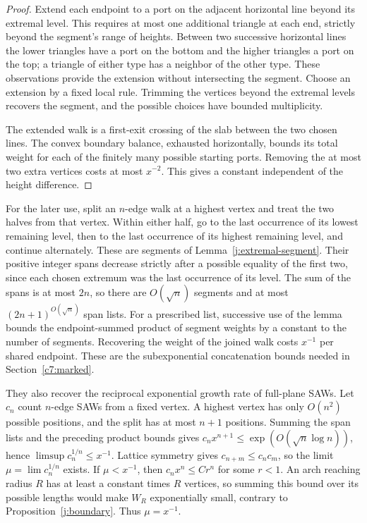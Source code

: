 \begin{proof}
Extend each endpoint to a port on the adjacent horizontal line beyond
its extremal level. This requires at most one additional triangle at
each end, strictly beyond the segment's range of heights. Between two
successive horizontal lines the lower triangles have a port on the
bottom and the higher triangles a port on the top; a triangle of either
type has a neighbor of the other type. These observations provide the
extension without intersecting the segment. Choose an extension by a
fixed local rule. Trimming the vertices beyond the extremal levels
recovers the segment, and the possible choices have bounded multiplicity.

The extended walk is a first-exit crossing of the slab between the two
chosen lines. The convex boundary balance, exhausted horizontally,
bounds its total weight for each of the finitely many possible starting
ports. Removing the at most two extra vertices costs at most $x^{-2}$.
This gives a constant independent of the height difference.
\end{proof}

For the later use, split an $n$-edge walk at a highest vertex and treat
the two halves from that vertex. Within either half, go to the last
occurrence of its lowest remaining level, then to the last occurrence
of its highest remaining level, and continue alternately. These are
segments of Lemma~\ref{j:extremal-segment}. Their positive integer spans
decrease strictly after a possible equality of the first two, since each
chosen extremum was the last occurrence of its level. The sum of the
spans is at most $2n$, so there are $O(\sqrt n)$ segments and at most
$(2n+1)^{O(\sqrt n)}$ span lists. For a prescribed list, successive use
of the lemma bounds the endpoint-summed product of segment weights by a
constant to the number of segments. Recovering the weight of the joined
walk costs $x^{-1}$ per shared endpoint. These are the subexponential
concatenation bounds needed in Section~\ref{c7:marked}.

They also recover the reciprocal exponential growth rate of full-plane
SAWs. Let $c_n$ count $n$-edge SAWs from a fixed vertex. A highest vertex
has only $O(n^2)$ possible positions, and the split has at most $n+1$
positions. Summing the span lists and the preceding product bounds gives
$c_nx^{n+1}\le\exp(O(\sqrt n\log n))$, hence
$\limsup c_n^{1/n}\le x^{-1}$. Lattice symmetry gives
$c_{n+m}\le c_nc_m$, so the limit $\mu=\lim c_n^{1/n}$ exists. If
$\mu<x^{-1}$, then $c_nx^n\le Cr^n$ for some $r<1$. An arch reaching
radius $R$ has at least a constant times $R$ vertices, so summing this
bound over its possible lengths would make $W_R$ exponentially small,
contrary to Proposition~\ref{j:boundary}. Thus $\mu=x^{-1}$.
\cite{DuminilCopinSmirnov2012}


